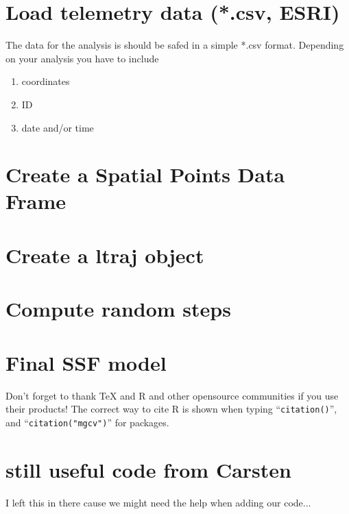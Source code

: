 \documentclass[11pt, a4paper]{article}\usepackage[]{graphicx}\usepackage[]{color}
\begin{document}
\section{Load telemetry data (*.csv, ESRI)}%
The data for the analysis is should be safed in a simple *.csv format. Depending on your analysis you have to include 
\begin{enumerate}
\item{coordinates}
\item{ID}
\item{date and/or time}
\end{enumerate}

\section{Create a Spatial Points Data Frame}%

\section{Create a ltraj object}%
 

\section{Compute random steps}


\section{Final SSF model}


Don't forget to thank TeX and R and other opensource communities if you use their products! The correct way to cite R is shown when typing ``\texttt{citation()}'', and ``\texttt{citation("mgcv")}'' for packages.






\newpage
\section{still useful code from Carsten}

 I left this in there cause we might need the help when adding our code...
\end{document}
